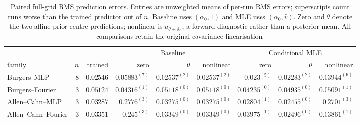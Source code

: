 \begin{table}[t]
\centering\small\setlength{\tabcolsep}{3pt}
\begin{tabular}{@{}lrr*{6}{r}@{}}
\toprule
 & & & \multicolumn{3}{c}{Baseline} & \multicolumn{3}{c}{Conditional MLE} \\
\cmidrule(lr){4-6}\cmidrule(l){7-9}
family & $n$ & trained & zero & $\theta$ & nonlinear & zero & $\theta$ & nonlinear \\
\midrule
Burgers--MLP & $8$ & $0.02546$ & $0.05883^{(7)}$ & $0.02537^{(2)}$ & $0.02537^{(2)}$ & $0.023^{(5)}$ & $0.02283^{(2)}$ & $0.03944^{(6)}$ \\
Burgers--Fourier & $3$ & $0.05124$ & $0.04316^{(1)}$ & $0.05118^{(0)}$ & $0.05118^{(0)}$ & $0.04235^{(0)}$ & $0.04935^{(0)}$ & $0.05091^{(1)}$ \\
Allen--Cahn--MLP & $3$ & $0.03287$ & $0.2776^{(3)}$ & $0.03275^{(0)}$ & $0.03275^{(0)}$ & $0.02804^{(1)}$ & $0.02455^{(0)}$ & $0.2701^{(3)}$ \\
Allen--Cahn--Fourier & $3$ & $0.03351$ & $0.245^{(3)}$ & $0.03349^{(0)}$ & $0.03349^{(0)}$ & $0.03975^{(1)}$ & $0.02496^{(0)}$ & $0.03861^{(1)}$ \\
\bottomrule
\end{tabular}
\caption{Paired full-grid RMS prediction errors. Entries are unweighted means
of per-run RMS errors; superscripts count runs worse than the trained predictor
out of $n$. Baseline uses $(\alpha_0,1)$ and MLE uses $(\alpha_0,\widehat v)$.
Zero and $\theta$ denote the two affine prior-centre predictions; nonlinear
is $u_{\theta+\delta_L}$, a forward diagnostic rather than a posterior mean.
All comparisons retain the original covariance linearisation.}
\label{tab:r2-centres}
\end{table}
